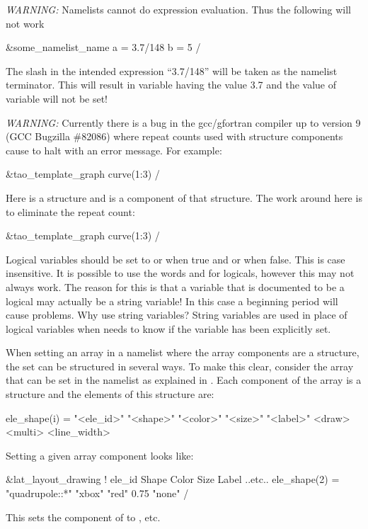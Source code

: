 {\em WARNING:} Namelists cannot do expression evaluation. Thus the following will not work
\begin{example}
  &some_namelist_name
    a = 3.7/148
    b = 5
  /
\end{example}
The slash in the intended expression ``3.7/148'' will be taken as the namelist terminator. This
will result in variable  having the value 3.7 and the value of variable  will not
be set!

{\em WARNING:} Currently there is a bug in the gcc/gfortran compiler up to version 9 (GCC Bugzilla
\#82086) where repeat counts used with structure components cause \tao to halt with an error
message. For example:
\begin{example}
  &tao_template_graph
    curve(1:3)%
  /
\end{example}
Here  is a structure and  is a component of that structure. The
work around here is to eliminate the repeat count:
\begin{example}
  &tao_template_graph
    curve(1:3)%
  /
\end{example}

Logical variables should be set to  or  when true and  or  when
false. This is case insensitive. It is possible to use the words  and  for
logicals, however this may not always work. The reason for this is that a variable that is
documented to be a logical may actually be a string variable! In this case a beginning period will
cause problems. Why use string variables? String variables are used in place of logical variables
when \tao needs to know if the variable has been explicitly set.

When setting an array in a namelist where the array components are a structure, the set can be
structured in several ways. To make this clear, consider the  array that can be set
in the  namelist as explained in . Each component
of the  array is a structure and the elements of this structure are:
\begin{example}
  ele_shape(i) = "<ele_id>" "<shape>" "<color>" "<size>" "<label>" <draw> <multi> <line_width>
\end{example}
Setting a given  array component looks like:
\begin{example}
  &lat_layout_drawing
    !               ele_id                  Shape      Color     Size  Label  ..etc..
    ele_shape(2) = "quadrupole::*"          "xbox"     "red"     0.75  "none" 
  /
\end{example}
This sets the  component of  to , etc.

